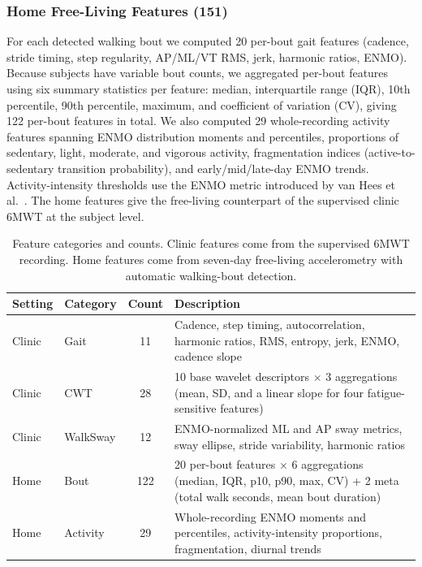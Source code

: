 \documentclass{article}
\begin{document}
\subsubsection{Home Free-Living Features (151)}
For each detected walking bout we computed 20 per-bout gait features (cadence, stride timing, step regularity, AP/ML/VT RMS, jerk, harmonic ratios, ENMO). Because subjects have variable bout counts, we aggregated per-bout features using six summary statistics per feature: median, interquartile range (IQR), 10th percentile, 90th percentile, maximum, and coefficient of variation (CV), giving 122 per-bout features in total. We also computed 29 whole-recording activity features spanning ENMO distribution moments and percentiles, proportions of sedentary, light, moderate, and vigorous activity, fragmentation indices (active-to-sedentary transition probability), and early/mid/late-day ENMO trends. Activity-intensity thresholds use the ENMO metric introduced by van Hees et al.~\cite{vanhees2013separating}. The home features give the free-living counterpart of the supervised clinic 6MWT at the subject level.

\begin{table}[!ht]
\centering
\caption{Feature categories and counts. Clinic features come from the supervised 6MWT recording. Home features come from seven-day free-living accelerometry with automatic walking-bout detection.}
\label{tab:features}
\small
\begin{tabular}{@{}p{1.2cm}p{2.4cm}cp{8.5cm}@{}}
\toprule
Setting & Category & Count & Description \\
\midrule
Clinic & Gait & 11 & Cadence, step timing, autocorrelation, harmonic ratios, RMS, entropy, jerk, ENMO, cadence slope \\
\addlinespace
Clinic & CWT & 28 & 10 base wavelet descriptors $\times$ 3 aggregations (mean, SD, and a linear slope for four fatigue-sensitive features) \\
\addlinespace
Clinic & WalkSway & 12 & ENMO-normalized ML and AP sway metrics, sway ellipse, stride variability, harmonic ratios \\
\addlinespace
Home & Bout & 122 & 20 per-bout features $\times$ 6 aggregations (median, IQR, p10, p90, max, CV) + 2 meta (total walk seconds, mean bout duration) \\
\addlinespace
Home & Activity & 29 & Whole-recording ENMO moments and percentiles, activity-intensity proportions, fragmentation, diurnal trends \\
\bottomrule
\end{tabular}
\end{table}
\end{document}
